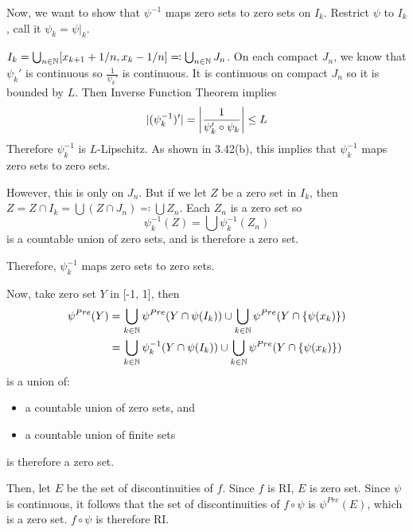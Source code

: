 \documentclass[a4paper, 12pt]{article}
\begin{document}
\begin{solution}
    Now, we want to show that $\psi^{-1}$ maps zero sets to zero sets on $I_k$. Restrict $\psi$ to $I_k$, call it $\psi_k = \psi|_k$.

    $I_k = \bigcup_{n \in \bbn} [x_{k+1} + 1/n, x_{k} - 1/n] \eqqcolon \bigcup_{n \in \bbn}J_n$. On each compact $J_n$, we know that $\psi_k'$ is continuous so $\frac{1}{\psi_k'}$ is continuous. It is continuous on compact $J_n$ so it is bounded by $L$. Then Inverse Function Theorem implies \[
    |(\psi_k^{-1})'| = \abs*{\frac{1}{\psi_k' \circ \psi_k}} \leq L
    \]
    Therefore $\psi_k^{-1}$ is $L$-Lipschitz. As shown in 3.42(b), this implies that $\psi_k^{-1}$ maps zero sets to zero sets.

    However, this is only on $J_n$. But if we let $Z$ be a zero set in $I_k$, then $Z = Z \cap I_k = \bigcup (Z \cap J_n) \eqqcolon \bigcup Z_n$. Each $Z_n$ is a zero set so \[
    \psi_k^{-1}(Z) = \bigcup \psi_k^{-1}(Z_n) 
    \]
    is a countable union of zero sets, and is therefore a zero set.

    Therefore, $\psi_k^{-1}$ maps zero sets to zero sets.

    Now, take zero set $Y$ in [-1, 1], then 
    \begin{align*}
        \psi^{Pre}(Y) &= \bigcup_{k\in \bbn}\psi^{Pre}(Y \cap \psi(I_k)) \cup \bigcup_{k\in \bbn}\psi^{Pre}(Y \cap \{\psi(x_k)\}) \\
        &= \bigcup_{k \in \bbn} \psi_k^{-1}(Y \cap \psi(I_k)) \cup \bigcup_{k\in \bbn}\psi^{Pre}(Y \cap \{\psi(x_k)\})
    \end{align*}
    is a union of:
\begin{itemize}
    \item a countable union of zero sets, and 
    \item a countable union of finite sets
\end{itemize}
    is therefore a zero set.
\end{solution}

Then, let $E$ be the set of discontinuities of $f$. Since $f$ is RI, $E$ is zero set. Since $\psi$ is continuous, it follows that the set of discontinuities of $f \circ \psi$ is $\psi^{Pre}(E)$, which is a zero set. $f \circ \psi$ is therefore RI.
\end{document}
